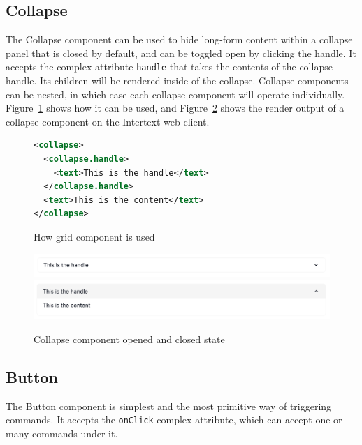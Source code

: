 \subsection{Collapse}

The Collapse component can be used to hide long-form content within a collapse panel that is closed by default, and can be toggled open by clicking the handle. It accepts the complex attribute \texttt{handle} that takes the contents of the collapse handle. Its children will be rendered inside of the collapse. Collapse components can be nested, in which case each collapse component will operate individually. Figure~\ref{fig:collapse_xml} shows how it can be used, and Figure~\ref{fig:collapse} shows the render output of a collapse component on the Intertext web client.

\begin{figure}[htb]
\begin{minipage}{\linewidth}
\begin{lstlisting}[language=xml]
<collapse>
  <collapse.handle>
    <text>This is the handle</text>
  </collapse.handle>
  <text>This is the content</text>
</collapse>
\end{lstlisting}
\end{minipage}
\caption{How grid component is used}%
\label{fig:collapse_xml}%
\end{figure}

\begin{figure}
  \centering
  \includegraphics[width=13cm]{thesis/paper/images/collapse_closed.png}
  \includegraphics[width=13cm]{thesis/paper/images/collapse_open.png}
  \caption{Collapse component opened and closed state}%
  \label{fig:collapse}%
\end{figure}

\newpage
\subsection{Button}

The Button component is simplest and the most primitive way of triggering commands. It accepts the \texttt{onClick} complex attribute, which can accept one or many commands under it.

